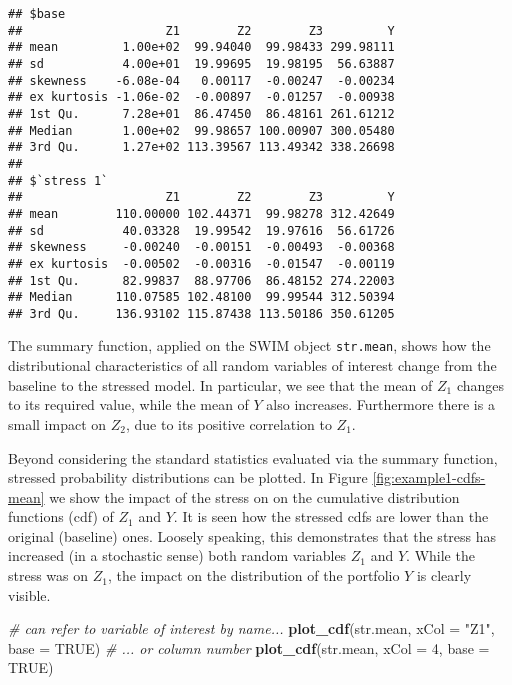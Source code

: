 \documentclass[]{article}
\newenvironment{Shaded}{\begin{snugshade}}{\end{snugshade}}
\newcommand{\CommentTok}[1]{\textcolor[rgb]{0.56,0.35,0.01}{\textit{#1}}}
\newcommand{\DataTypeTok}[1]{\textcolor[rgb]{0.13,0.29,0.53}{#1}}
\newcommand{\DecValTok}[1]{\textcolor[rgb]{0.00,0.00,0.81}{#1}}
\newcommand{\KeywordTok}[1]{\textcolor[rgb]{0.13,0.29,0.53}{\textbf{#1}}}
\newcommand{\NormalTok}[1]{#1}
\newcommand{\OtherTok}[1]{\textcolor[rgb]{0.56,0.35,0.01}{#1}}
\newcommand{\StringTok}[1]{\textcolor[rgb]{0.31,0.60,0.02}{#1}}
\begin{document}
\begin{verbatim}
## $base
##                    Z1        Z2        Z3         Y
## mean         1.00e+02  99.94040  99.98433 299.98111
## sd           4.00e+01  19.99695  19.98195  56.63887
## skewness    -6.08e-04   0.00117  -0.00247  -0.00234
## ex kurtosis -1.06e-02  -0.00897  -0.01257  -0.00938
## 1st Qu.      7.28e+01  86.47450  86.48161 261.61212
## Median       1.00e+02  99.98657 100.00907 300.05480
## 3rd Qu.      1.27e+02 113.39567 113.49342 338.26698
## 
## $`stress 1`
##                    Z1        Z2        Z3         Y
## mean        110.00000 102.44371  99.98278 312.42649
## sd           40.03328  19.99542  19.97616  56.61726
## skewness     -0.00240  -0.00151  -0.00493  -0.00368
## ex kurtosis  -0.00502  -0.00316  -0.01547  -0.00119
## 1st Qu.      82.99837  88.97706  86.48152 274.22003
## Median      110.07585 102.48100  99.99544 312.50394
## 3rd Qu.     136.93102 115.87438 113.50186 350.61205
\end{verbatim}

The summary function, applied on the SWIM object \texttt{str.mean}, shows how the distributional characteristics of all random variables of interest change from the baseline to the stressed model. In particular, we see that the mean of \(Z_1\) changes to its required value, while the mean of \(Y\) also increases. Furthermore there is a small impact on \(Z_2\), due to its positive correlation to \(Z_1\).

Beyond considering the standard statistics evaluated via the summary function, stressed probability distributions can be plotted. In Figure \ref{fig:example1-cdfs-mean} we show the impact of the stress on on the cumulative distribution functions (cdf) of \(Z_1\) and \(Y\). It is seen how the stressed cdfs are lower than the original (baseline) ones. Loosely speaking, this demonstrates that the stress has increased (in a stochastic sense) both random variables \(Z_1\) and \(Y\). While the stress was on \(Z_1\), the impact on the distribution of the portfolio \(Y\) is clearly visible.

\begin{Shaded}
\begin{Highlighting}[]
\CommentTok{# can refer to variable of interest by name...}
\KeywordTok{plot_cdf}\NormalTok{(str.mean, }\DataTypeTok{xCol =} \StringTok{"Z1"}\NormalTok{, }\DataTypeTok{base =} \OtherTok{TRUE}\NormalTok{)}
\CommentTok{# ... or column number}
\KeywordTok{plot_cdf}\NormalTok{(str.mean, }\DataTypeTok{xCol =} \DecValTok{4}\NormalTok{, }\DataTypeTok{base =} \OtherTok{TRUE}\NormalTok{)}
\end{Highlighting}
\end{Shaded}
\end{document}
